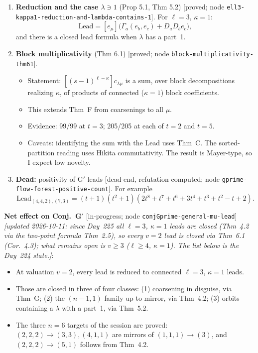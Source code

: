 \documentclass[10pt]{article}
\newcommand{\grade}[1]{\textsf{[#1]}}
\newcommand{\Lead}{\mathrm{Lead}}
\begin{document}
\begin{enumerate}
  Evidence: 20/20 full $(s,t)$ for $n\le6$; 11/11 leads for $n\le10$.
\item \textbf{Reduction and the case $\lambda\ni1$} (Prop 5.1, Thm 5.2)
  \grade{proved; node \texttt{ell3-kappa1-reduction-and-lambda-contains-1}}. For $\ell=3$, $\kappa=1$:
  \[\Lead=[e_\mu]\big(\Gamma_a(e_b,e_c)+D_aD_be_c\big),\]
  and there is a closed lead formula when $\lambda$ has a part~1.
\item \textbf{Block multiplicativity} (Thm 6.1) \grade{proved; node \texttt{block-multiplicativity-thm61}}.
  \begin{itemize}
  \item Statement: $[(s-1)^{\ell-\kappa}]c_{\lambda\mu}$ is a sum, over block decompositions realizing $\kappa$, of
    products of connected ($\kappa=1$) block coefficients.
  \item This extends Thm~F from coarsenings to all $\mu$.
  \item Evidence: 99/99 at $t=3$; 205/205 at each of $t=2$ and $t=5$.
  \item Caveats: identifying the sum with the Lead uses Thm~C. The sorted-partition reading uses Hikita commutativity.
    The result is Mayer-type, so I expect low novelty.
  \end{itemize}
\item \textbf{Dead:} positivity of G$'$ leads \grade{dead-end, refutation computed; node
  \texttt{gprime-flow-forest-positive-count}}. For example
  \[\Lead_{(4,4,2),(7,3)}=(t+1)(t^2+1)(2t^8+t^7+t^6+3t^4+t^3+t^2-t+2).\]
\end{enumerate}
\textbf{Net effect on Conj.~G$'$} \grade{in-progress; node \texttt{conjGprime-general-mu-lead}}
\emph{[updated 2026-10-11: since Day~225 all $\ell=3$, $\kappa=1$ leads are closed (Thm~4.2 via the two-point formula Thm~2.5),
so every $v=2$ lead is closed via Thm~6.1 (Cor.~4.3); what remains open is $v\ge3$ ($\ell\ge4$, $\kappa=1$). The list below is the Day~224 state.]}:
\begin{itemize}
\item At valuation $v=2$, every lead is reduced to connected $\ell=3$, $\kappa=1$ leads.
\item Those are closed in three of four classes: (1) coarsening in disguise, via Thm~G; (2) the $(n-1,1)$ family up to
  mirror, via Thm~4.2; (3) orbits containing a $\lambda$ with a part~1, via Thm~5.2.
\item The three $n=6$ targets of the session are proved: $(2,2,2)\to(3,3),(4,1,1)$ are mirrors of $(1,1,1)\to(3)$, and
  $(2,2,2)\to(5,1)$ follows from Thm~4.2.
\end{itemize}
\end{document}
